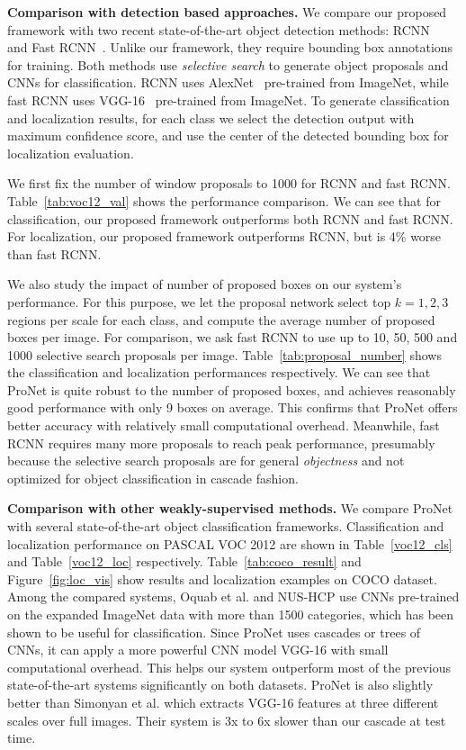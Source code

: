 \documentclass[10pt,twocolumn,letterpaper]{article}
\begin{document}
\textbf{Comparison with detection based approaches.} We compare our proposed framework with two recent state-of-the-art object detection methods: RCNN~\cite{DBLP:journals/corr/GirshickDDM13} and Fast RCNN~\cite{DBLP:journals/corr/Girshick15}. Unlike our framework, they require bounding box annotations for training. Both methods use \textit{selective search} to generate object proposals and CNNs for classification. RCNN uses AlexNet~\cite{NIPS2012_4824} pre-trained from ImageNet, while fast RCNN uses VGG-16~\cite{Simonyan14c} pre-trained from ImageNet. To generate classification and localization results, for each class we select the detection output with maximum confidence score, and use the center of the detected bounding box for localization evaluation.

We first fix the number of window proposals to 1000 for RCNN and fast RCNN. Table~\ref{tab:voc12_val} shows the performance comparison. We can see that for classification, our proposed framework outperforms both RCNN and fast RCNN. For localization, our proposed framework outperforms RCNN, but is 4\% worse than fast RCNN. 

We also study the impact of number of proposed boxes on our system's performance. For this purpose, we let the proposal network select top $k=1,2,3$ regions per scale for each class, and compute the average number of proposed boxes per image. For comparison, we ask fast RCNN to use up to 10, 50, 500 and 1000 selective search proposals per image. Table~\ref{tab:proposal_number} shows the classification and localization performances respectively. We can see that ProNet is quite robust to the number of proposed boxes, and achieves reasonably good performance with only 9 boxes on average. This confirms that ProNet offers better accuracy with relatively small computational overhead. Meanwhile, fast RCNN requires many more proposals to reach peak performance, presumably because the selective search proposals are for general \textit{objectness} and not optimized for object classification in cascade fashion.

\textbf{Comparison with other weakly-supervised methods.} We compare ProNet with several state-of-the-art object classification frameworks. Classification and localization performance on PASCAL VOC 2012 are shown in Table~\ref{voc12_cls} and Table~\ref{voc12_loc} respectively. Table~\ref{tab:coco_result} and Figure~\ref{fig:loc_vis} show results and localization examples on COCO dataset. Among the compared systems, Oquab et al. and NUS-HCP use CNNs pre-trained on the expanded ImageNet data with more than 1500 categories, which has been shown to be useful for classification. Since ProNet uses cascades or trees of CNNs, it can apply a more powerful CNN model VGG-16 with small computational overhead. This helps our system outperform most of the previous state-of-the-art systems significantly on both datasets. ProNet is also slightly better than Simonyan et al. which extracts VGG-16 features at three different scales over full images. Their system is 3x to 6x slower than our cascade at test time.
\end{document}
